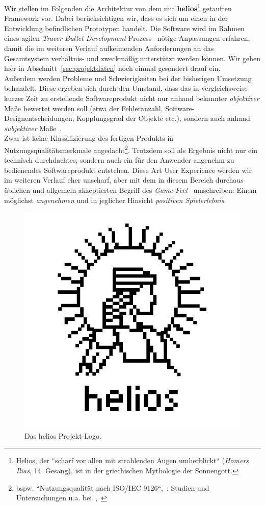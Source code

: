 Wir stellen im Folgenden die Architektur von dem mit \textbf{helios}\footnote{
    Helios, der ``scharf vor allen mit strahlenden Augen umherblickt`` (\textit{Homers Ilias}, 14. Gesang), ist in der griechischen Mythologie der Sonnengott.
} getauften Framework vor.
Dabei berücksichtigen wir, dass es sich um einen in der Entwicklung befindlichen Prototypen handelt.
Die Software wird im Rahmen eines agilen \textit{Tracer Bullet Development}-Prozess~\cite[50 f.]{TH20} nötige Anpassungen erfahren, damit die im weiteren Verlauf aufkeimenden Anforderungen an das Gesamtsystem verhältnis- und zweckmäßig unterstützt werden können.
Wir gehen hier in Abschnitt~\ref{sec:projektdaten} noch einmal gesondert drauf ein.\\

Außerdem werden Probleme und Schwierigkeiten bei der bisherigen Umsetzung behandelt.
Diese ergeben sich durch den Umstand, dass das in vergleichsweise kurzer Zeit zu erstellende Softwareprodukt nicht nur anhand bekannter \textit{objektiver} Maße bewertet werden soll (etwa der Fehleranzahl, Software-Designentscheidungen, Kopplungsgrad der Objekte etc.), sondern auch anhand \textit{subjektiver} Maße~\cite[385]{Bal08}.\\
Zwar ist keine Klassifizierung des fertigen Produkts in Nutzungsqualitätsmerkmale angedacht\footnote{bspw. ``Nutzungsqualität nach ISO/IEC 9126``,~\cite[466]{Bal08}; Studien und Untersuchungen u.a. bei~\cite[]{AZMK17},~\cite[]{Ber10}}.
Trotzdem soll als Ergebnis nicht nur ein technisch durchdachtes, sondern auch ein für den Anwender angenehm zu bedienendes Softwareprodukt entstehen.
Diese Art User Experience werden wir im weiteren Verlauf eher unscharf, aber mit dem in diesem Bereich durchaus üblichen und allgemein akzeptierten Begriff des \textit{Game Feel}~\cite[]{Swi08} umschreiben: Einem möglichst \textit{angenehmen} und in jeglicher Hinsicht \textit{positiven Spielerlebnis}.

\begin{figure}[!h]
    \centering
    \includegraphics[width=0.5\columnwidth]{img/helios_logo}
    \caption{Das helios Projekt-Logo.}
    \label{fig:helios_logo}
\end{figure}
